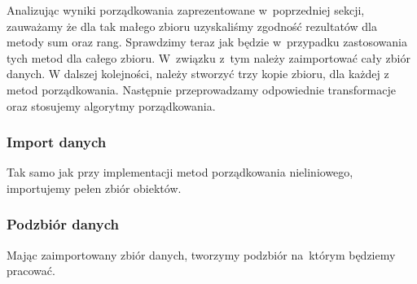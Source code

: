 \documentclass[12pt,a4paper]{report}
\begin{document}
{Analizując wyniki porządkowania zaprezentowane w~poprzedniej sekcji, zauważamy że dla tak małego zbioru uzyskaliśmy zgodność rezultatów dla metody sum oraz rang. Sprawdzimy teraz jak będzie w~przypadku zastosowania tych metod dla całego zbioru. W~związku z~tym należy zaimportować cały zbiór danych. W dalszej kolejności, należy stworzyć trzy kopie zbioru, dla każdej z metod porządkowania. Następnie przeprowadzamy odpowiednie transformacje oraz stosujemy algorytmy porządkowania.
 
\subsubsection{Import danych}
Tak samo jak przy implementacji metod porządkowania nieliniowego, importujemy pełen zbiór obiektów.
\begin{Shaded}
\begin{Highlighting}[]
\StringTok{ }\NormalTok{(}\NormalTok{, }
                            \NormalTok{)}
\end{Highlighting}
\end{Shaded}
\subsubsection{Podzbiór danych}
Mając zaimportowany zbiór danych, tworzymy podzbiór na~którym będziemy pracować. 
\begin{Shaded}
\begin{Highlighting}[]
\NormalTok{dane_porzadkowanie<-zbior_danych[}\NormalTok{(}\NormalTok{,}\NormalTok{,}\NormalTok{,}
                                   \NormalTok{,}
                                   \NormalTok{,}\NormalTok{)]}
\end{Highlighting}
\end{Shaded}
}
\end{document}
